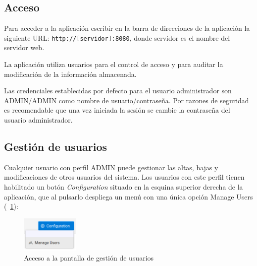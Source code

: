  
\subsection{Acceso}
\label{sub:acceso-administrador}
 
Para acceder a la aplicación escribir en la barra de direcciones de la aplicación la
siguiente URL: {\footnotesize \tt http://[servidor]:8080}, donde servidor es el nombre del servidor web.

La aplicación utiliza usuarios para el control de acceso y para auditar la
modificación de la información almacenada.

Las credenciales establecidas por defecto para el usuario administrador son ADMIN/ADMIN como nombre de usuario/contraseña. Por razones de seguridad es recomendable que una vez iniciada la sesión se cambie la contraseña del usuario administrador.
 
 
 
\subsection{Gestión de usuarios}
\label{sub:gestion-usuarios}

Cualquier usuario con perfil ADMIN puede gestionar las altas, bajas y modificaciones de otros usuarios del sistema. Los usuarios con este perfil tienen habilitado un botón \emph{Configuration} situado en la esquina superior derecha de la aplicación, que al pulsarlo despliega un menú con una única opción Manage Users (\figurename~\ref{fig:boton-gestion-usuarios}):

\begin{figure}[H]
  \centering
  \includegraphics[width=0.25\textwidth]{imaxes/gestion-usuarios-01.png}
  \caption{Acceso a la pantalla de gestión de usuarios}
  \label{fig:boton-gestion-usuarios}
\end{figure}


